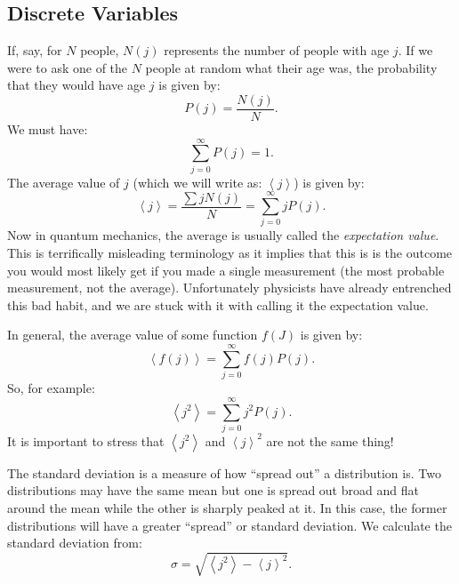 \documentclass{article}
\begin{document}
\subsection{Discrete Variables}
If, say, for $N$ people, $N(j)$ represents the number of people with age $j$. If we were to ask one of the $N$ people at random what their age was, the probability that they would have age $j$ is given by:
\begin{equation}
P(j) =  \frac{N(j)}{N}.
\end{equation}
We must have:
\begin{equation}
\sum_{j=0}^{\infty} P(j) = 1.
\end{equation}
The average value of $j$ (which we will write as: $\left<j\right>$) is given by:
\begin{equation}
\left< j \right> = \frac{\sum jN(j)}{N} = \sum_{j=0}^{\infty} j P(j).
\end{equation}
Now in quantum mechanics, the average is usually called the \emph{expectation value}. This is terrifically misleading terminology as it implies that this is is the outcome you would most likely get if you made a single measurement (the most probable measurement, not the average). Unfortunately physicists have already entrenched this bad habit, and we are stuck with it with calling it the expectation value.

In general, the average value of some function $f(J)$ is given by:
\begin{equation}
\left< f(j) \right> = \sum_{j=0}^{\infty}f(j)P(j).
\end{equation}
So, for example:
\begin{equation}
\left< j^{2} \right> = \sum_{j=0}^{\infty} j^{2}P(j).
\end{equation}
It is important to stress that $\left< j^{2} \right>$ and $\left< j \right>^{2}$ are not the same thing!

The standard deviation is a measure of how ``spread out'' a distribution is. Two distributions may have the same mean but one is spread out broad and flat around the mean while the other is sharply peaked at it. In this case, the former distributions will have a greater ``spread'' or standard deviation. We calculate the standard deviation from:
\begin{equation}
\sigma = \sqrt{\left< j^{2} \right> - \left< j \right>^{2}}.
\end{equation}
\end{document}
